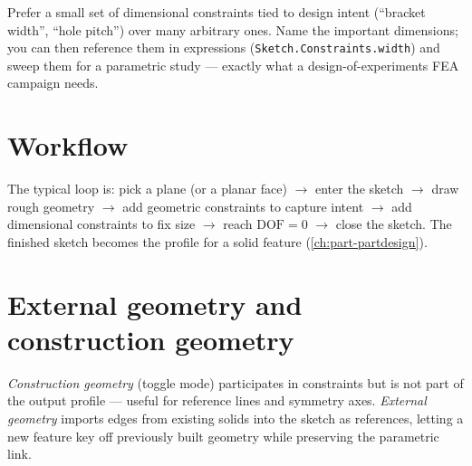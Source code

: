 \begin{fctip}
Prefer a small set of dimensional constraints tied to design intent
(``bracket width'', ``hole pitch'') over many arbitrary ones. Name the
important dimensions; you can then reference them in expressions
(\texttt{Sketch.Constraints.width}) and sweep them for a parametric
study --- exactly what a design-of-experiments FEA campaign needs.
\end{fctip}

\section{Workflow}

The typical loop is: pick a plane (or a planar face) $\rightarrow$ enter
the sketch $\rightarrow$ draw rough geometry $\rightarrow$ add geometric
constraints to capture intent $\rightarrow$ add dimensional constraints
to fix size $\rightarrow$ reach $\text{DOF}=0$ $\rightarrow$ close the
sketch. The finished sketch becomes the profile for a solid feature
(\cref{ch:part-partdesign}).

\section{External geometry and construction geometry}

\emph{Construction geometry} (toggle mode) participates in constraints
but is not part of the output profile --- useful for reference lines and
symmetry axes. \emph{External geometry} imports edges from existing
solids into the sketch as references, letting a new feature key off
previously built geometry while preserving the parametric link.
